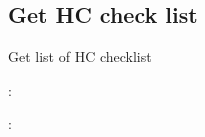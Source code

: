 \documentclass[letterpaper,10pt,english,openany,oneside]{sphinxmanual}
\begin{document}
\subsection{Get HC check list}
\label{\detokenize{api-checklist/v1:get-hc-check-list}}

\begin{fulllineitems}
\label{\detokenize{api-checklist/v1:post--api-checklist-v1-hc-list}}
\sphinxAtStartPar
Get list of HC checklist

\sphinxAtStartPar
{}:

\begin{sphinxVerbatim}[commandchars=\\\{\}]
\end{sphinxVerbatim}

\sphinxAtStartPar
{}:


\end{fulllineitems}
\end{document}
